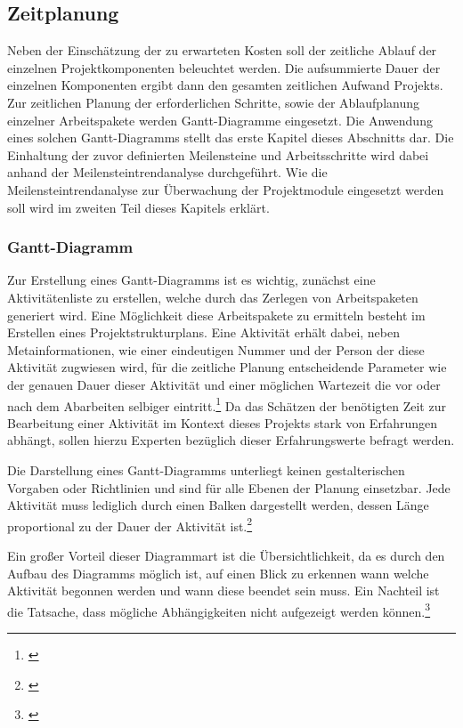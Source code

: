 \subsection{Zeitplanung}
Neben der Einschätzung der zu erwarteten Kosten soll der zeitliche Ablauf der einzelnen Projektkomponenten beleuchtet werden. Die aufsummierte Dauer der einzelnen Komponenten ergibt dann den gesamten zeitlichen Aufwand Projekts. Zur zeitlichen Planung der erforderlichen Schritte, sowie der Ablaufplanung einzelner Arbeitspakete werden Gantt-Diagramme eingesetzt. Die Anwendung eines solchen Gantt-Diagramms stellt das erste Kapitel dieses Abschnitts dar. Die Einhaltung der zuvor definierten Meilensteine und Arbeitsschritte wird dabei anhand der Meilensteintrendanalyse durchgeführt. Wie die Meilensteintrendanalyse zur Überwachung der Projektmodule eingesetzt werden soll wird im zweiten Teil dieses Kapitels erklärt.

\subsubsection{Gantt-Diagramm}
Zur Erstellung eines Gantt-Diagramms ist es wichtig, zunächst eine Aktivitätenliste zu erstellen, welche durch das Zerlegen von Arbeitspaketen generiert wird. Eine Möglichkeit diese Arbeitspakete zu ermitteln besteht im Erstellen eines Projektstrukturplans. Eine Aktivität erhält dabei, neben Metainformationen, wie einer eindeutigen Nummer und der Person der diese Aktivität zugwiesen wird, für die zeitliche Planung entscheidende Parameter wie der genauen Dauer dieser Aktivität und einer möglichen Wartezeit die vor oder nach dem Abarbeiten selbiger eintritt.\footnote{\cite{kraus_projekt_2010}}  Da das Schätzen der benötigten Zeit zur Bearbeitung einer Aktivität im Kontext dieses Projekts stark von Erfahrungen abhängt, sollen hierzu Experten bezüglich dieser Erfahrungswerte befragt werden.

Die Darstellung eines Gantt-Diagramms unterliegt keinen gestalterischen Vorgaben oder Richtlinien und sind für alle Ebenen der Planung einsetzbar. Jede Aktivität muss lediglich durch einen Balken dargestellt werden, dessen Länge proportional zu der Dauer der Aktivität ist.\footnote{\cite{jakoby_intensivtraining_2015}}

Ein großer Vorteil dieser Diagrammart ist die Übersichtlichkeit, da es durch den Aufbau des Diagramms möglich ist, auf einen Blick zu erkennen wann welche Aktivität begonnen werden und wann diese beendet sein muss. Ein Nachteil ist die Tatsache, dass mögliche Abhängigkeiten nicht aufgezeigt werden können.\footnote{\cite{kraus_projekt_2010}}

